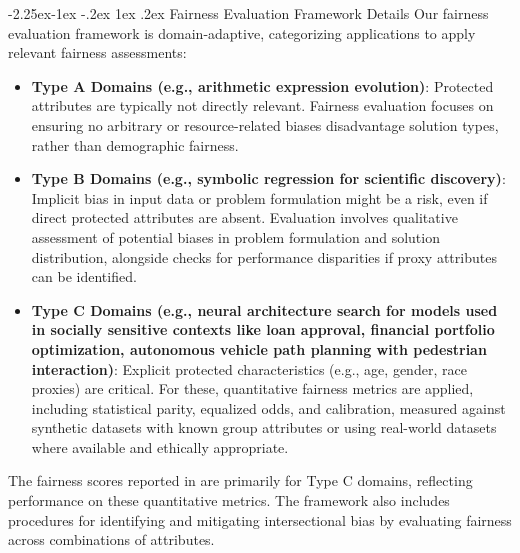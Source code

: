 \documentclass[manuscript,screen,review,anonymous,9pt]{acmart}
\makeatletter
\renewcommand\subsection{\@startsection{subsection}{2}{\z@}%
  {-2.25ex\@plus -1ex \@minus -.2ex}%
  {1ex \@plus .2ex}%
  {\normalfont\large\bfseries}}
\makeatother
\begin{document}
\subsection{Fairness Evaluation Framework Details}
Our fairness evaluation framework is domain-adaptive, categorizing applications to apply relevant fairness assessments:
\begin{itemize}[leftmargin=*,itemsep=1pt,parsep=1pt]
    \item \textbf{Type A Domains (e.g., arithmetic expression evolution)}: Protected attributes are typically not directly relevant. Fairness evaluation focuses on ensuring no arbitrary or resource-related biases disadvantage solution types, rather than demographic fairness.
    \item \textbf{Type B Domains (e.g., symbolic regression for scientific discovery)}: Implicit bias in input data or problem formulation might be a risk, even if direct protected attributes are absent. Evaluation involves qualitative assessment of potential biases in problem formulation and solution distribution, alongside checks for performance disparities if proxy attributes can be identified.
    \item \textbf{Type C Domains (e.g., neural architecture search for models used in socially sensitive contexts like loan approval, financial portfolio optimization, autonomous vehicle path planning with pedestrian interaction)}: Explicit protected characteristics (e.g., age, gender, race proxies) are critical. For these, quantitative fairness metrics are applied, including statistical parity, equalized odds, and calibration, measured against synthetic datasets with known group attributes or using real-world datasets where available and ethically appropriate.
\end{itemize}
The fairness scores reported in  are primarily for Type C domains, reflecting performance on these quantitative metrics. The framework also includes procedures for identifying and mitigating intersectional bias by evaluating fairness across combinations of attributes.
\end{document}
